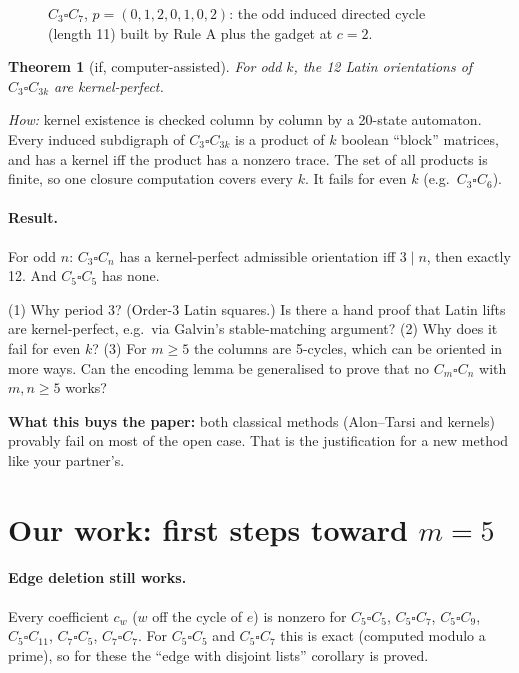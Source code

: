 \documentclass[11pt]{article}
\theoremstyle{plain}
\newtheorem{theorem}{Theorem}[section]
\theoremstyle{definition}
\newcommand{\T}{\square}
\begin{document}
\begin{figure}[ht]
\centering
\resizebox{0.95\textwidth}{!}{}
\caption{$C_3\T C_7$, $p=(0,1,2,0,1,0,2)$: the odd induced directed cycle (length 11) built by
Rule A plus the gadget at $c=2$.}
\end{figure}

\begin{theorem}[if, computer-assisted]
For odd $k$, the 12 Latin orientations of $C_3\T C_{3k}$ are kernel-perfect.
\end{theorem}
\emph{How:} kernel existence is checked column by column by a 20-state automaton. Every
induced subdigraph of $C_3\T C_{3k}$ is a product of $k$ boolean ``block'' matrices, and has a
kernel iff the product has a nonzero trace. The set of all products is finite, so one
closure computation covers every $k$. It fails for even $k$ (e.g.\ $C_3\T C_6$).

\paragraph{Result.} For odd $n$: $C_3\T C_n$ has a kernel-perfect admissible orientation iff
$3\mid n$, then exactly 12. And $C_5\T C_5$ has none.

\begin{ponder}
(1) Why period 3? (Order-3 Latin squares.) Is there a hand proof that Latin lifts are
kernel-perfect, e.g.\ via Galvin's stable-matching argument?
(2) Why does it fail for even $k$?
(3) For $m\ge5$ the columns are 5-cycles, which can be oriented in more ways. Can the
encoding lemma be generalised to prove that no $C_m\T C_n$ with $m,n\ge5$ works?
\end{ponder}

\textbf{What this buys the paper:} both classical methods (Alon--Tarsi and kernels) provably
fail on most of the open case. That is the justification for a new method like your partner's.

\section{Our work: first steps toward \texorpdfstring{$m=5$}{m = 5}}

\paragraph{Edge deletion still works.} Every coefficient $c_w$ ($w$ off the cycle of $e$) is
nonzero for $C_5\T C_5$, $C_5\T C_7$, $C_5\T C_9$, $C_5\T C_{11}$, $C_7\T C_5$, $C_7\T C_7$.
For $C_5\T C_5$ and $C_5\T C_7$ this is exact (computed modulo a prime), so for these the
``edge with disjoint lists'' corollary is proved.
\end{document}
